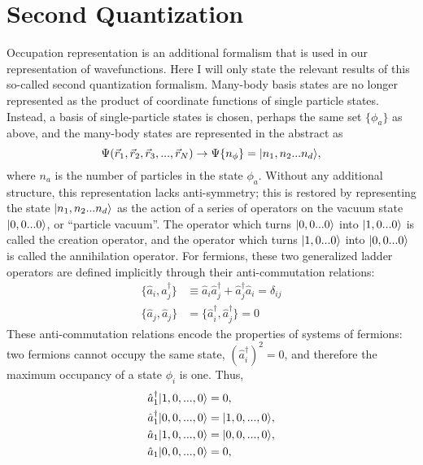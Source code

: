 \section{Second Quantization}
Occupation representation is an additional formalism that is used in our 
representation of wavefunctions. Here 
I will only state the relevant results of this so-called second quantization formalism. 
Many-body basis states
are no longer represented as the product of coordinate functions of single particle states.
Instead, a basis of single-particle states is chosen, perhaps the same set
$\{\phi_a\}$ as above, and the many-body states are represented in the abstract
as
\begin{equation}
    \Psi(\vec{r}_1,\vec{r}_2,\vec{r}_3,...,\vec{r}_N)\to\Psi{\{n_\phi\}} = |n_1,n_2...n_d\rangle,
\end{equation}
where $n_a$ is the number of particles in the state $\phi_a$. Without any additional
structure, this representation lacks anti-symmetry; this is restored by representing
the state $|n_1,n_2...n_d\rangle$ as the action of a series of operators on the vacuum
state $|0,0...0\rangle$, or ``particle vacuum''. The operator which turns $|0,0...0\rangle$ into $|1,0...0\rangle$
is called the creation operator, and the operator which turns $|1,0...0\rangle$ into
$|0,0...0\rangle$ is called the annihilation operator. For fermions, these two generalized
ladder operators are defined implicitly through their anti-commutation relations\cite{Waleka}:
\begin{equation}\begin{split}
    \{\hat{a}_i,\hat{a}^\dagger_j\}&\equiv\hat{a}_i\hat{a}^\dagger_j+\hat{a}^\dagger_j\hat{a}_i
        =\delta_{ij}\\
    \{\hat{a}_j,\hat{a}_j\}&=\{\hat{a}^\dagger_i,\hat{a}^\dagger_j\}=0
\end{split}\end{equation}
These anti-commutation relations encode the properties of systems of fermions:
two fermions cannot occupy the same state, $(\hat{a}^\dagger_i)^2=0$, and 
therefore the maximum occupancy of a state $\phi_i$ is one. Thus, 
\begin{equation}\begin{split}
    \hat{a}^\dagger_1 |1,0,...,0\rangle &= 0, \\
    \hat{a}^\dagger_1 |0,0,...,0\rangle &= |1,0,...,0\rangle,\\
    \hat{a}_1 |1,0,...,0\rangle &= |0,0,...,0\rangle, \\
    \hat{a}_1 |0,0,...,0\rangle &= 0,
\end{split}\end{equation}
